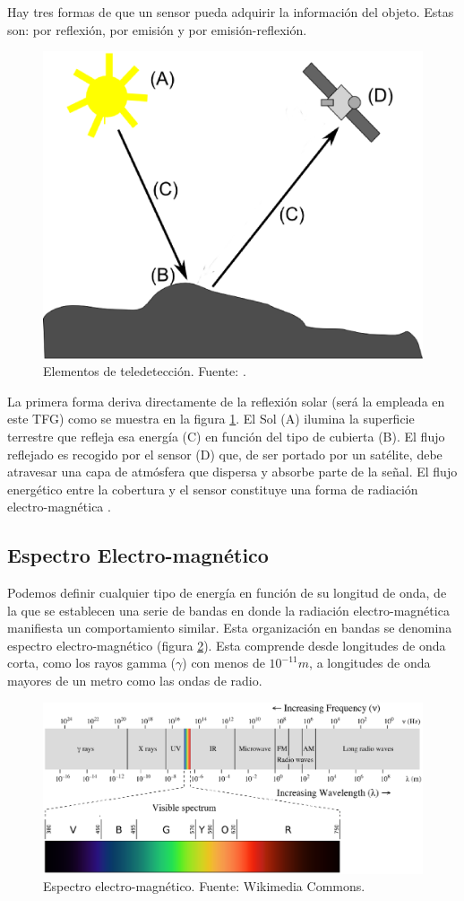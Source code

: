 Hay tres formas de que un sensor pueda adquirir la información del objeto. Estas son: por reflexión, por emisión y por emisión-reflexión.\Sep

\begin{figure}
	\centering
	\includegraphics[width=0.4\linewidth]{./Imagenes/Elementos_teledeteccion_modificado.eps}
	\caption[Elementos de teledetección]{Elementos de teledetección. Fuente: \cite{Olaya2010}.}
	\label{fig:elementos}
\end{figure}

La primera forma deriva directamente de la reflexión solar (será la empleada en este \ac{TFG}) como se muestra en la figura \ref{fig:elementos}. El Sol (A) ilumina la superficie terrestre que refleja esa energía (C) en función del tipo de cubierta (B). El flujo reflejado es recogido por el sensor (D) que, de ser portado por un satélite, debe atravesar una capa de atmósfera que dispersa y absorbe parte de la señal. El flujo energético entre la cobertura y el sensor constituye una forma de radiación electro-magnética \citep{Olaya2010}.\Sep

\subsection{Espectro Electro-magnético}
Podemos definir cualquier tipo de energía en función de su longitud de onda, de la que se establecen una serie de bandas en donde la radiación electro-magnética manifiesta un comportamiento similar. Esta organización en bandas se denomina espectro electro-magnético (figura \ref{fig:espectro}). Esta comprende desde longitudes de onda corta, como los rayos gamma ($\gamma$) con menos de $10^{-11} m$, a longitudes de onda mayores de un metro como las ondas de radio.\Sep

\begin{figure}
	\centering	
	\includegraphics[width=0.9\linewidth]{./Imagenes/Espectro.eps}
	\caption[Espectro electro-magnético]{Espectro electro-magnético. Fuente: Wikimedia Commons.}
	\label{fig:espectro}
\end{figure}

